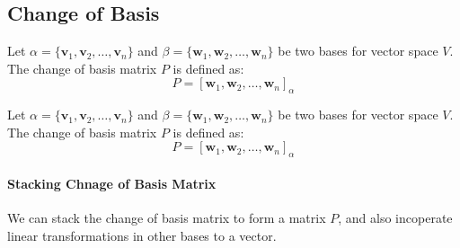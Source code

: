 \documentclass[11pt]{article}
\begin{document}
\subsection{Change of Basis}
\begin{definition}
    Let $\alpha = \{\textbf{v}_1, \textbf{v}_2, \ldots, \textbf{v}_n\}$ and $\beta = \{\textbf{w}_1, \textbf{w}_2, \ldots, \textbf{w}_n\}$ be two bases for vector space $V$. The change of basis matrix $P$ is defined as:
    \begin{equation}
        P = [\textbf{w}_1, \textbf{w}_2, \ldots, \textbf{w}_n]_\alpha
    \end{equation}
\end{definition}
\begin{theorem}
    Let $\alpha = \{\textbf{v}_1, \textbf{v}_2, \ldots, \textbf{v}_n\}$ and $\beta = \{\textbf{w}_1, \textbf{w}_2, \ldots, \textbf{w}_n\}$ be two bases for vector space $V$. The change of basis matrix $P$ is defined as:
    \begin{equation}
        P = [\textbf{w}_1, \textbf{w}_2, \ldots, \textbf{w}_n]_\alpha
    \end{equation}
\end{theorem}
\paragraph{Stacking Chnage of Basis Matrix} We can stack the change of basis matrix to form a matrix $P$, and also incoperate linear transformations in other bases to a vector.
\end{document}
